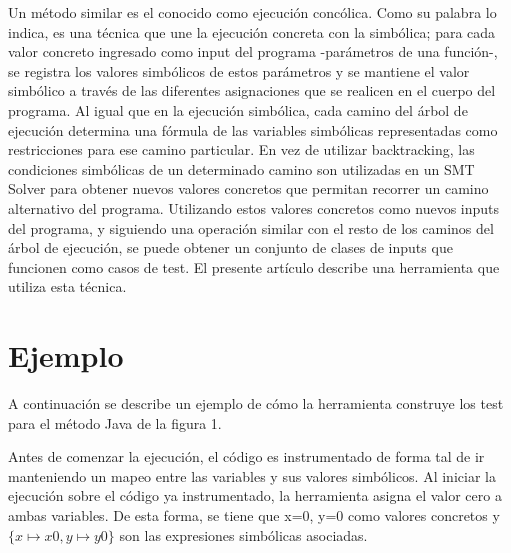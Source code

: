 \documentclass{llncs}
\begin{document}
Un método similar es el conocido como ejecución concólica. Como su palabra lo indica, es una técnica que une la ejecución concreta con la simbólica; para cada valor concreto ingresado como input del programa -parámetros de una función-, se registra los valores simbólicos de estos parámetros y se mantiene el valor simbólico a través de las diferentes asignaciones que se realicen en el cuerpo del programa. Al igual que en la ejecución simbólica, cada camino del árbol de ejecución determina una fórmula de las variables simbólicas representadas como restricciones para ese camino particular. En vez de utilizar backtracking, las condiciones simbólicas de un determinado camino son utilizadas en un SMT Solver para obtener nuevos valores concretos que permitan recorrer un camino alternativo del programa. Utilizando estos valores concretos como nuevos inputs del programa, y siguiendo una operación similar con el resto de los caminos del árbol de ejecución, se puede obtener un conjunto de clases de inputs que funcionen como casos de test. El presente artículo describe una herramienta que utiliza esta técnica.


\section{Ejemplo}
A continuación se describe un ejemplo de cómo la herramienta construye los test para el método Java de la figura 1.

Antes de comenzar la ejecución, el código es instrumentado de forma tal de ir manteniendo un mapeo entre las variables y sus valores simbólicos. Al iniciar la ejecución sobre el código ya instrumentado, la herramienta asigna el valor cero a ambas variables.
De esta forma, se tiene que x=0, y=0 como valores concretos y \(\{x\mapsto x0,y\mapsto y0\}\) son las expresiones simbólicas asociadas.
\end{document}
